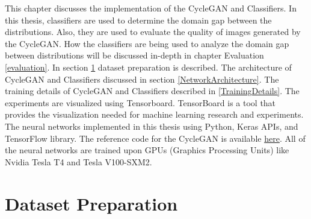 \justifying
\setlength{\parskip}{1em}

This chapter discusses the implementation of the \ac{CycleGAN} and Classifiers. In this thesis, classifiers are used to determine the domain gap between the distributions. Also, they are used to evaluate the quality of images generated by the \ac{CycleGAN}. How the classifiers are being used to analyze the domain gap between distributions will be discussed in-depth in chapter Evaluation \ref{evaluation}. In section \ref{DatasetPreparation} dataset preparation is described. The architecture of \ac{CycleGAN} and Classifiers discussed in section \ref{NetworkArchitecture}. The training details of \ac{CycleGAN} and Classifiers described in \ref{TrainingDetails}. The experiments are visualized using Tensorboard\footnotemark. TensorBoard is a tool that provides the visualization needed for machine learning research and experiments. The neural networks implemented in this thesis using Python, Keras APIs, and TensorFlow library\cite{tensorflow2015-whitepaper}. The reference code for the \ac{CycleGAN} is available \href{https://keras.io/examples/generative/cyclegan/}{here}. All of the neural networks are trained upon GPUs (Graphics Processing Units) like Nvidia Tesla T4 and Tesla V100-SXM2.



\section{Dataset Preparation}\label{DatasetPreparation}

